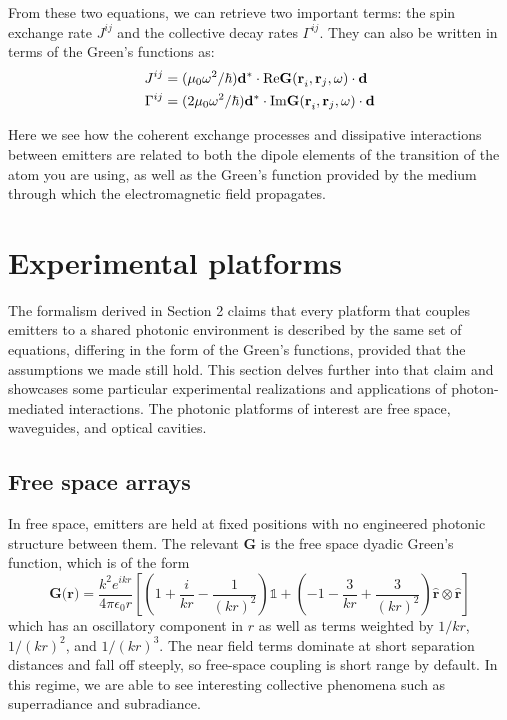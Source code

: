 \documentclass{article}
\begin{document}
From these two equations, we can retrieve two important terms: the spin exchange rate
$J^{ij}$ and the collective decay rates $\Gamma^{ij}$. They can also be written in
terms of the Green's functions as:
\begin{align}
  J^{ij} &= (\mu_0\omega^2/\hbar) \mathbf{d}^*\cdot \mathrm{Re}\mathbf{G(r}_i, {\bf
  r}_j, \omega)\cdot {\bf d}\\
  \Gamma^{ij} &= (2\mu_0\omega^2/\hbar) {\bf d}^* \cdot \mathrm{Im}\mathbf{G(r}_i,
  {\bf r}_j, \omega)\cdot {\bf d}
\end{align}

Here we see how the coherent exchange processes and dissipative interactions between
emitters are related to both the dipole elements of the transition of the atom you are
using, as well as the Green's function provided by the medium through which the
electromagnetic field propagates.



\section{Experimental platforms}
The formalism derived in Section 2 claims that every platform that couples emitters to
a shared photonic environment is described by the same set of equations, differing in
the form of the Green's functions, provided that the assumptions we made still hold.
This section delves further into that claim and showcases some particular experimental
realizations and applications of photon-mediated interactions. The photonic platforms
of interest are free space, waveguides, and optical cavities.

\subsection{Free space arrays}

In free space, emitters are held at fixed positions with no engineered photonic
structure between them. The relevant $\mathbf{G}$ is the free space dyadic Green's
function, which is of the form \cite{novotny_principles_2012}
\begin{equation}
  \mathbf{G(r}) = \frac{k^2e^{ikr}}{4\pi\epsilon_0r}\left[ \left(1 + \frac{i}{kr} -
    \frac{1}{(kr)^2} \right) \mathbb{1}+ \left(-1-\frac{3}{kr} + \frac{3}{(kr)^2}\right)
\hat{\mathbf{r}}\otimes\hat{\mathbf{r}} \right]
\end{equation}
which has an oscillatory component in $r$ as well as terms weighted by $1/kr$,
$1/(kr)^2$, and $1/(kr)^3$. The near field terms dominate at short separation
distances and fall off steeply, so free-space coupling is short range by default. In
this regime, we are able to see interesting collective phenomena such as superradiance
and subradiance. 
\end{document}
